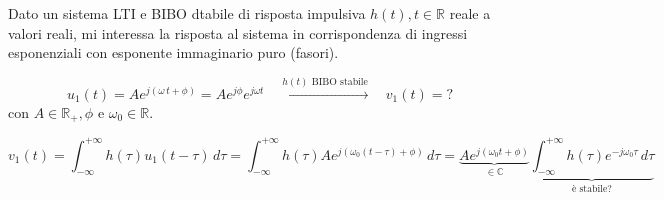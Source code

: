 Dato un sistema LTI e BIBO dtabile di risposta impulsiva $h(t), t \in \mathbb{R}$ reale a valori reali, mi interessa la risposta al sistema in corrispondenza di ingressi esponenziali con esponente immaginario puro (fasori).

\[ 
	 u_1(t) =Ae^{j(\omega \, t + \phi)}= Ae^{j\phi}e^{j\omega t} \quad \overset{h(t)\text{ BIBO stabile}}{\longmapsto} \quad v_1(t)=?
\]
con $A \in \mathbb{R_+}, \phi$ e $\omega_0 \in \mathbb{R}$. %

\[
	v_1(t) = \int_{-\infty}^{+\infty}h(\tau)u_1(t-\tau)\,d\tau
	= \int_{-\infty}^{+\infty}h(\tau)Ae^{j(\omega_0(t-\tau)+\phi)}\,d\tau
	= \underbrace{Ae^{j(\omega_0 t+\phi)}}_{\in \mathbb{C}} \underbrace{\int_{-\infty}^{+\infty}h(\tau)e^{-j\omega_0 \tau}\, d\tau}_{\text{è stabile?}}
\]


